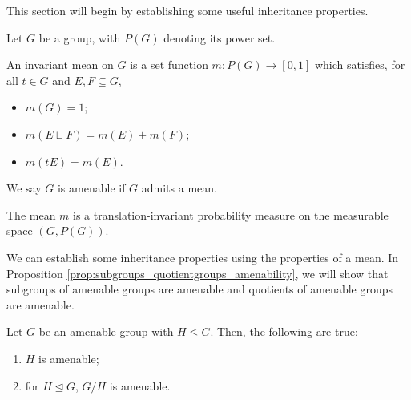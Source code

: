 This section will begin by establishing some useful inheritance properties.
\begin{definition}
  Let $G$ be a group, with $P(G)$ denoting its power set.\newline

  An invariant mean on $G$ is a set function $m\colon P(G)\rightarrow [0,1]$ which satisfies, for all $t\in G$ and $E,F\subseteq G$,
  \begin{itemize}
    \item $m(G) = 1$;
    \item $m\left(E\sqcup F\right) = m(E) + m(F)$;
    \item $m\left(tE\right) = m\left(E\right)$.
  \end{itemize}
  We say $G$ is amenable if $G$ admits a mean.\newline

  The mean $m$ is a translation-invariant probability measure on the measurable space $\left(G,P(G)\right)$.
\end{definition}
We can establish some inheritance properties using the properties of a mean. In Proposition \ref{prop:subgroups_quotientgroups_amenability}, we will show that subgroups of amenable groups are amenable and quotients of amenable groups are amenable.
\begin{proposition}\label{prop:subgroups_quotientgroups_amenability}
  Let $G$ be an amenable group with $H\leq G$. Then, the following are true:
  \begin{enumerate}[(1)]
    \item $H$ is amenable;
    \item for $H\trianglelefteq G$, $G/H$ is amenable.
  \end{enumerate}
\end{proposition}
